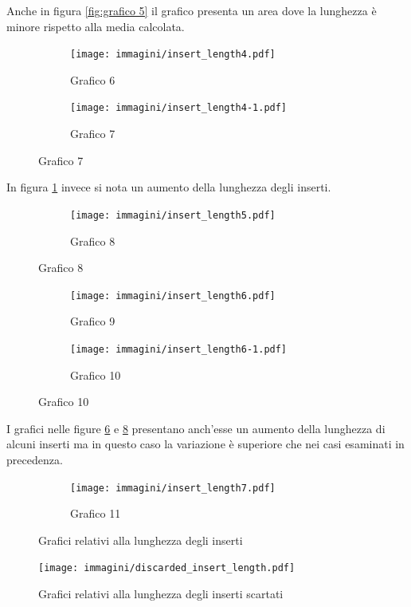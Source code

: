 Anche in figura \ref{fig:grafico 5} il grafico presenta un area dove la lunghezza è minore rispetto alla media calcolata.

\begin{figure}[htbp]
	\ContinuedFloat
	\centering
	\begin{subfigure}[b]{.45\textwidth}	
		\texttt{[image: immagini/insert\_length4.pdf]}
		\caption{Grafico 6}
		\label{fig:grafico 6}
	\end{subfigure}
	\quad
	\begin{subfigure}[b]{.45\textwidth}
		\texttt{[image: immagini/insert\_length4-1.pdf]}
		\caption{Grafico 7}
		\label{fig:grafico 7}
	\end{subfigure}
\end{figure}

In figura \ref{fig:grafico 6} invece si nota un aumento della lunghezza degli inserti.

\begin{figure}[htbp]
	\ContinuedFloat
	\centering
	\begin{subfigure}[b]{.45\textwidth}
		\texttt{[image: immagini/insert\_length5.pdf]}
		\caption{Grafico 8}
		\label{fig:grafico 8}
	\end{subfigure}
\end{figure}
\begin{figure}[htbp]
	\ContinuedFloat
	\centering
	\begin{subfigure}[b]{.45\textwidth}
		\texttt{[image: immagini/insert\_length6.pdf]}
		\caption{Grafico 9}
		\label{fig:grafico 9}
	\end{subfigure}
	\quad
	\begin{subfigure}[b]{.45\textwidth}
		\texttt{[image: immagini/insert\_length6-1.pdf]}
		\caption{Grafico 10}
		\label{fig:grafico 10}
	\end{subfigure}
\end{figure}

I grafici nelle figure \ref{fig:grafico 9} e \ref{fig:grafico 10} presentano anch'esse un aumento della lunghezza di alcuni inserti ma in questo caso la variazione è superiore che nei casi esaminati in precedenza.

\begin{figure}[htbp]
	\ContinuedFloat
	\centering
	\begin{subfigure}[b]{.45\textwidth}
		\texttt{[image: immagini/insert\_length7.pdf]}
		\caption{Grafico 11}
		\label{fig:grafico 11}
	\end{subfigure}
	\caption{Grafici relativi alla lunghezza degli inserti}
\end{figure}
\begin{figure}[htbp]
	\centering
	\texttt{[image: immagini/discarded\_insert\_length.pdf]}
	\caption{Grafici relativi alla lunghezza degli inserti scartati}
	\label{fig:discarded insert length}
\end{figure}

